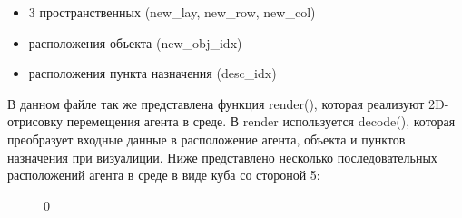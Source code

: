 \documentclass[a4paper]{report}
\theoremstyle{definition}
\theoremstyle{plain}
\theoremstyle{remark}
\theoremstyle{remark}
\theoremstyle{definition}
\begin{document}
\begin{itemize}
    \item 3 пространственных (new\_lay, new\_row, new\_col)
    \item расположения объекта (new\_obj\_idx)
    \item расположения пункта назначения (desc\_idx)
\end{itemize}
В данном файле так же представлена функция render(), которая реализуют 2D-отрисовку перемещения агента в среде. В render используется decode(), которая преобразует входные данные в расположение агента, объекта и пунктов назначения при визуалиции. Ниже представлено несколько последовательных расположений агента в среде в виде куба со стороной 5:
\begin{figure}[H]
    \begin{minipage}[H]{0.24\linewidth}
         0\\
    \end{minipage}
    \begin{minipage}[H]{0.24\linewidth}

\end{minipage}
\end{figure}
\end{document}
